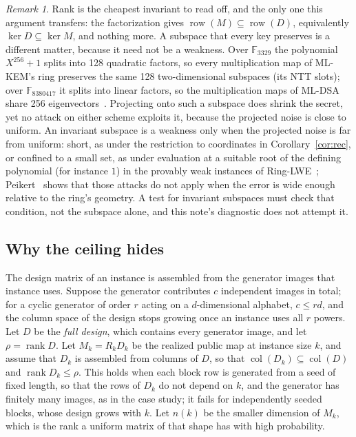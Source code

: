 \documentclass[11pt]{article}
\makeatletter
\theoremstyle{remark}
\newtheorem{remark}{Remark}
\newcommand{\F}{\mathbb{F}}
\DeclareMathOperator{\rank}{rank}
\DeclareMathOperator{\col}{col}
\DeclareMathOperator{\row}{row}
\DeclareRobustCommand{\_}{%
  \edef\@tempa{\ttdefault}%
  \ifx\f@family\@tempa\char95 \else\textunderscore\fi\penalty300\relax}
\makeatother
\begin{document}
\begin{remark}\label{rem:inv}
Rank is the cheapest invariant to read off, and the only one this argument transfers: the factorization gives
$\row(M)\subseteq\row(D)$, equivalently $\ker D\subseteq\ker M$, and nothing more. A subspace that every key preserves is
a different matter, because it need not be a weakness. Over $\F_{3329}$ the polynomial $X^{256}+1$ splits into 128
quadratic factors, so every multiplication map of ML-KEM's ring preserves the same 128 two-dimensional subspaces (its
NTT slots); over $\F_{8380417}$ it splits into linear factors, so the multiplication maps of ML-DSA share 256
eigenvectors~\cite{FIPS}. Projecting onto such a subspace does shrink the secret, yet no attack on either scheme
exploits it, because the projected noise is close to uniform. An invariant subspace is a weakness only when the projected
noise is far from uniform: short, as under the restriction to coordinates in Corollary~\ref{cor:rec}, or confined to a
small set, as under evaluation at a suitable root of the defining polynomial (for instance $1$) in the provably weak
instances of Ring-LWE~\cite{ELOS15,CIV16}; Peikert~\cite{Pei16} shows that those attacks do not apply when the error is
wide enough relative to the ring's geometry. A test for invariant subspaces must check that condition, not the subspace
alone, and this note's diagnostic does not attempt it.
\end{remark}

\subsection{Why the ceiling hides}\label{sec:vis}

The design matrix of an instance is assembled from the generator images that instance uses. Suppose the generator
contributes $c$ independent images in total; for a cyclic generator of order $r$ acting on a $d$-dimensional alphabet,
$c\le rd$, and the column space of the design stops growing once an instance uses all $r$ powers. Let $D$ be the
\emph{full design}, which contains every generator image, and let $\rho=\rank D$. Let $M_k=R_kD_k$ be the realized public
map at instance size $k$, and assume that $D_k$ is assembled from columns of $D$, so that $\col(D_k)\subseteq\col(D)$ and
$\rank D_k\le\rho$. This holds when each block row is generated from a seed of fixed length, so that the rows of $D_k$
do not depend on $k$, and the generator has finitely many images, as in the case study; it fails for independently
seeded blocks, whose design grows with $k$. Let $n(k)$ be the smaller dimension of
$M_k$, which is the rank a uniform matrix of that shape has with high probability.
\end{document}
